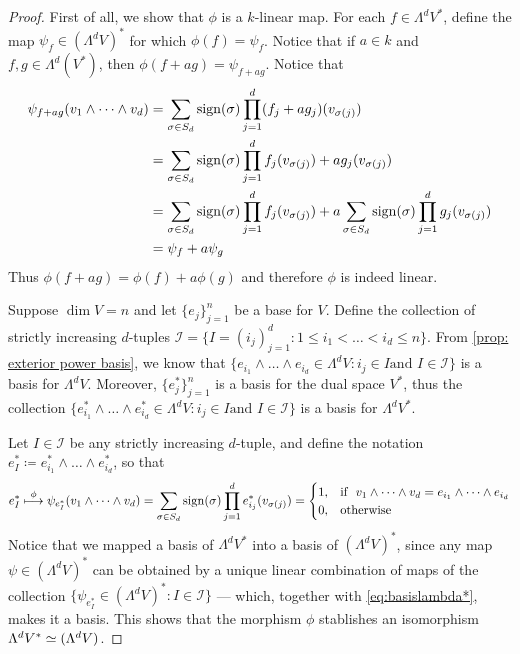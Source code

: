 \begin{proof}
First of all, we show that \(\phi\) is a \(k\)-linear map. For each \(f \in
\Lambda^d V^{*}\), define the map \(\psi_{f} \in (\Lambda^dV)^{*}\) for which \(\phi(f) =
\psi_f\). Notice that if \(a \in k\) and \(f, g \in \Lambda^d(V^{*})\), then \(\phi(f + a g) =
\psi_{f + a g}\). Notice that
\begin{align*}
  \psi_{f + ag}(v_1 \wedge \dots \wedge v_d)
  &= \sum_{\sigma \in S_d} \operatorname{sign}(\sigma) \prod_{j=1}^d (f_{j} + a g_{j})(v_{\sigma(j)}) \\
  &= \sum_{\sigma \in S_d} \operatorname{sign}(\sigma) \prod_{j=1}^d f_j(v_{\sigma(j)}) + a g_j(v_{\sigma(j)}) \\
  &= \sum_{\sigma \in S_d} \operatorname{sign}(\sigma) \prod_{j=1}^d f_j(v_{\sigma(j)})
  + a \sum_{\sigma \in S_d} \operatorname{sign}(\sigma) \prod_{j=1}^d g_j(v_{\sigma(j)}) \\
  &= \psi_f + a \psi_g
\end{align*}
Thus \(\phi(f + ag) = \phi(f) + a \phi(g)\) and therefore \(\phi\) is indeed linear.

Suppose \(\dim V = n\) and let \(\{e_{j}\}_{j=1}^n\) be a base for \(V\). Define
the collection of strictly increasing \(d\)-tuples \(\mathcal I = \{I =
(i_{j})_{j=1}^d : 1 \leq i_1 < \dots < i_d \leq n\}\). From \cref{prop: exterior power
basis}, we know that \(\{e_{i_{1}} \wedge \dots \wedge e_{i_{d}} \in \Lambda^d V: i_j \in I \text{
and } I \in \mathcal I\}\) is a basis for \(\Lambda^d V\). Moreover,
\(\{e_{j}^{*}\}_{j=1}^n\) is a basis for the dual space \(V^{*}\), thus the
collection \(\{e_{i_{1}}^{*} \wedge \dots \wedge e_{i_{d}}^{*} \in \Lambda^d V: i_j \in I \text{
  and } I \in \mathcal I\}\) is a basis for \(\Lambda^d V^{*}\).

Let \(I \in \mathcal I\) be any strictly increasing \(d\)-tuple, and define the
notation \(e_I^{*} \coloneq e_{i_1}^{*} \wedge \dots \wedge e_{i_d}^{*}\), so that
\begin{equation}
  \label{eq:basislambda*}
  e_I^{*} \overset{\phi}\longmapsto
  \psi_{e_I^{*}}(v_1 \wedge \dots \wedge v_d)
  = \sum_{\sigma \in S_{d}} \operatorname{sign}(\sigma) \prod_{j=1}^d e_{i_j}^{*}(v_{\sigma(j)}) =
  \begin{cases}
    1, &\text{if }\ v_1 \wedge \dots \wedge v_d = e_{i_1} \wedge \dots \wedge e_{i_d} \\
    0, &\text{otherwise}
  \end{cases}
\end{equation}
Notice that we mapped a basis of \(\Lambda^d V^{*}\) into a basis of \((\Lambda^d V)^{*}\),
since any map \(\psi \in (\Lambda^d V)^{*}\) can be obtained by a unique linear combination
of maps of the collection \(\{\psi_{e_{I}^{*}} \in (\Lambda^d V)^{*} : I \in \mathcal I\}\)
--- which, together with \cref{eq:basislambda*}, makes it a basis. This shows that
the morphism \(\phi\) stablishes an isomorphism \(\Lambda^dV^{*} \simeq (\Lambda^d V)\).
\end{proof}

